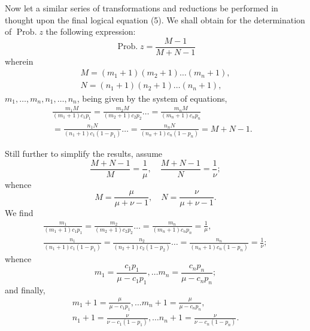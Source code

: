 \documentclass[oneside]{book}
\begin{document}
Now let a similar series of transformations and reductions be
performed in thought upon the final logical equation (5). We
shall obtain for the determination of $\operatorname{Prob. } z$ the following
expression:
\begin{equation*}\tag{10}
\operatorname{Prob. } z = \frac{M-1}{M+N-1}
\end{equation*}
wherein
\begin{gather*}
M=(m_1 + 1) (m_2 + 1)\dotsc (m_n + 1), \\
N = (n_1 + 1) (n_2 + 1)\dotsc (n_n + 1),
\end{gather*}
$m_1, \dotsc, m_n, n_1,\dotsc,n_n$, being given by the system of equations,
\begin{equation*}\tag{11}\begin{split}
\frac{m_1 M}{(m_1 + 1) c_1 p_1} = \frac{m_2 M}{(m_2 + 1) c_2 p_2} \dotso = \frac{m_n M}{(m_n + 1) c_n p_n} &\\
 =\frac{n_1 N}{(n_1 + 1)c_1 (1-p_1)}\dotso
= \frac{n_n N}{(n_n+1)c_n(1-p_n)} =M+N-1.&
\end{split}\end{equation*}

Still further to simplify the results, assume
\begin{equation*}
\frac{M+N-1}{M}=\frac{1}{\mu}, \quad \frac{M+N-1}{N}=\frac{1}{\nu};
\end{equation*}
whence
\begin{equation*}
M=\frac{\mu}{\mu+\nu-1}, \quad N=\frac{\nu}{\mu+\nu-1}.
\end{equation*}
We find
\begin{gather*}
\frac{m_1}{(m_1+1)c_1 p_1}=\frac{m_2}{(m_2+1)c_2 p_2}\dotso =\frac{m_n}{(m_n+1)c_n p_n}=\frac{1}{\mu}, \\
\frac{n_1}{(n_1+1)c_1(1-p_1)}=\frac{n_2}{(n_2+1)c_2(1-p_2)}\dotso =\frac{n_n}{(n_n+1)c_n(1-p_n)}=\frac{1}{\nu};
\end{gather*}
whence
\begin{equation*}
m_1=\frac{c_1 p_1}{\mu - c_1 p_1}, \dotsc
m_n=\frac{c_n p_n}{\mu - c_n p_n};
\end{equation*}
and finally,
\begin{gather*}
m_1+1=\frac{\mu}{\mu-c_1 p_1}, \dotsc
m_n+1=\frac{\mu}{\mu-c_n p_n}, \\
n_1+1=\frac{\nu}{\nu-c_1(1-p_1)}, \dotsc
n_n+1=\frac{\nu}{\nu-c_n(1-p_n)}.
\end{gather*}
\end{document}
